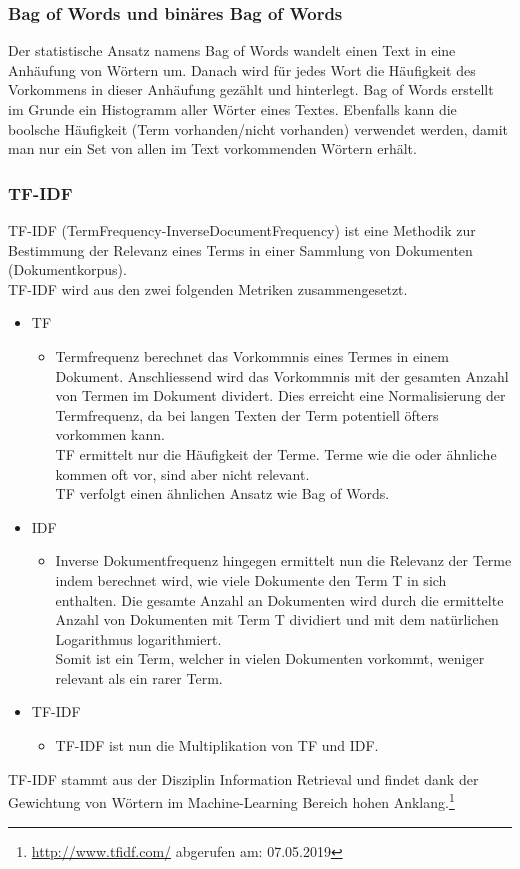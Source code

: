 \subsubsection{Bag of Words und binäres Bag of Words}\label{sub:bow}
Der statistische Ansatz namens \glqq Bag of Words\grqq{} wandelt einen Text in eine Anhäufung von Wörtern um.
Danach wird für jedes Wort die Häufigkeit des Vorkommens in dieser Anhäufung gezählt und hinterlegt.
Bag of Words erstellt im Grunde ein Histogramm aller Wörter eines Textes.
Ebenfalls kann die boolsche Häufigkeit (Term vorhanden/nicht vorhanden) verwendet werden, damit man nur ein Set von allen im Text vorkommenden Wörtern erhält.
\subsubsection{TF-IDF}\label{sub:tfidf}
TF-IDF (TermFrequency-InverseDocumentFrequency) ist eine Methodik zur Bestimmung der Relevanz eines Terms in einer Sammlung von Dokumenten (Dokumentkorpus).\\
TF-IDF wird aus den zwei folgenden Metriken zusammengesetzt.
\begin{itemize}
	\item TF
	\begin{itemize}
		\item Termfrequenz berechnet das Vorkommnis eines Termes in einem Dokument. Anschliessend wird das Vorkommnis mit der gesamten Anzahl von Termen im Dokument dividert. Dies erreicht eine Normalisierung der Termfrequenz, da bei langen Texten der Term potentiell öfters vorkommen kann.\\
		TF ermittelt nur die Häufigkeit der Terme. Terme wie \glqq die\grqq{} oder ähnliche kommen oft vor, sind aber nicht relevant.\\
		TF verfolgt einen ähnlichen Ansatz wie Bag of Words.
	\end{itemize}
	\item IDF
	\begin{itemize}
		\item Inverse Dokumentfrequenz hingegen ermittelt nun die Relevanz der Terme indem berechnet wird, wie viele Dokumente den Term T in sich enthalten. Die gesamte Anzahl an Dokumenten wird durch die ermittelte Anzahl von Dokumenten mit Term T dividiert und mit dem natürlichen Logarithmus logarithmiert.\\
		Somit ist ein Term, welcher in vielen Dokumenten vorkommt, weniger relevant als ein rarer Term.
	\end{itemize}
	\item TF-IDF
	\begin{itemize}
		\item TF-IDF ist nun die Multiplikation von TF und IDF.
	\end{itemize}
\end{itemize}
TF-IDF stammt aus der Disziplin \glqq Information Retrieval\grqq{} und findet dank der Gewichtung von Wörtern im Machine-Learning Bereich hohen Anklang.\footnote{\url{http://www.tfidf.com/} abgerufen am: 07.05.2019}
